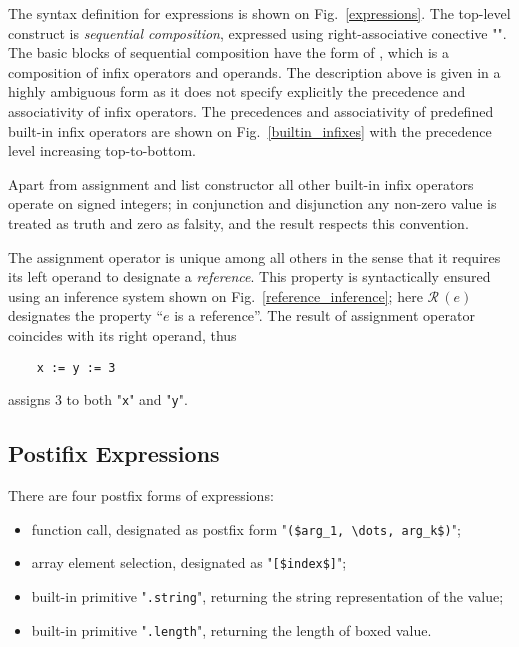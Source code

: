 The syntax definition for expressions is shown on Fig.~\ref{expressions}. The top-level construct is \emph{sequential composition}, expressed
using right-associative conective "\term{;}". The basic blocks of sequential composition have the form of , which is
a composition of infix operators and operands. The description above is given in a highly ambiguous form as it does not specify explicitly the
precedence and associativity of infix operators. The precedences and associativity of predefined built-in infix operators are shown
on Fig.~\ref{builtin_infixes} with the precedence level increasing top-to-bottom.

Apart from assignment and list constructor all other built-in infix operators operate on signed integers; in conjunction and disjunction
any non-zero value is treated as truth and zero as falsity, and the result respects this convention.

The assignment operator is unique among all others in the sense that it requires its left operand to designate a \emph{reference}. This
property is syntactically ensured using an inference system shown on Fig.~\ref{reference_inference}; here $\mathcal{R}\,(e)$ designates the
property ``$e$ is a reference''. The result of assignment operator coincides with its right operand, thus

\begin{lstlisting}
    x := y := 3
\end{lstlisting}

assigns 3 to both "\lstinline|x|" and "\lstinline|y|".

\subsection{Postifix Expressions}

There are four postfix forms of expressions:

\begin{itemize}
\item function call, designated as postfix form "\lstinline|($arg_1, \dots, arg_k$)|";
\item array element selection, designated as "\lstinline|[$index$]|";
\item built-in primitive "\lstinline|.string|", returning the string representation of the value;
\item built-in primitive "\lstinline|.length|", returning the length of boxed value.
\end{itemize}

